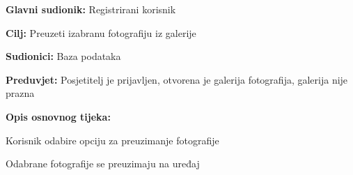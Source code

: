 					\noindent {}
					\begin{packed_item}
						
						\item \textbf{Glavni sudionik: } Registrirani korisnik
						\item  \textbf{Cilj:} Preuzeti izabranu fotografiju iz galerije
						\item  \textbf{Sudionici:} Baza podataka
						\item  \textbf{Preduvjet:} Posjetitelj je prijavljen, otvorena je galerija fotografija, galerija nije prazna
						\item  \textbf{Opis osnovnog tijeka:}
						
						\item[] \begin{packed_enum}
							
							\item Korisnik odabire opciju za preuzimanje fotografije
							\item Odabrane fotografije se preuzimaju na uređaj
							
						\end{packed_enum}
						
					\end{packed_item}
					
